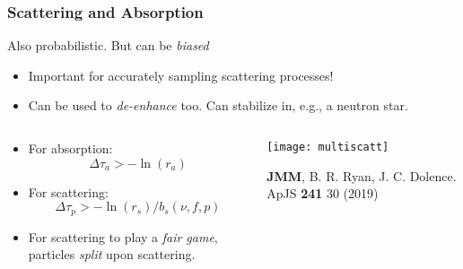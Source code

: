\documentclass[]{beamer}
\begin{document}
\begin{frame}
  \frametitle{Scattering and Absorption}
  Also probabilistic. But can be \textit{biased}
  \begin{itemize}
  \item Important for accurately sampling scattering processes!
  \item Can be used to \textit{de-enhance} too. Can stabilize in, e.g., a neutron star.
  \end{itemize}
  \begin{columns}
    \begin{column}{5cm}
      \begin{itemize}
      \item For absorption:
        $$\Delta \tau_a > - \ln(r_a)$$
      \item For scattering:
        $$\Delta \tau_p > -\ln(r_s)/b_s(\nu, f, p)$$
      \item For scattering to play a \textit{fair game}, particles
        \textit{split} upon scattering.
      \end{itemize}
    \end{column}
    \begin{column}{7cm}
      \begin{center}
        \texttt{[image: multiscatt]}
      \end{center}
      {\tiny \textbf{JMM}, B. R. Ryan, J. C. Dolence. ApJS \textbf{241} 30 (2019)}
    \end{column}
  \end{columns}
\end{frame}
\end{document}
